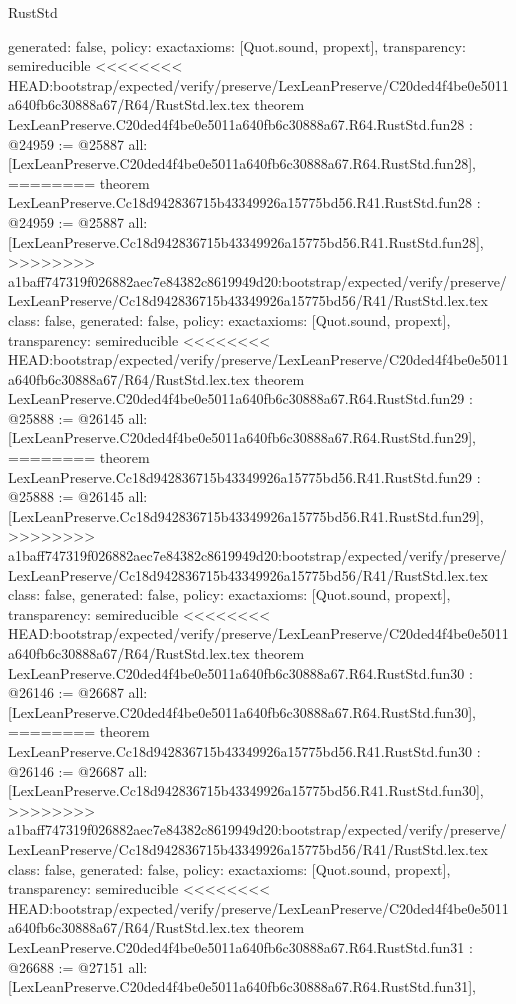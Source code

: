 \begin{lexlean}{RustStd}
\begin{coremodule}
{\begin{coremodule}
{{{{{{{{{{{{{{{{{{{{{{{{{{{{{{{  generated: false,
  policy: exact{axioms: [Quot.sound, propext]},
  transparency: semireducible
}
<<<<<<<< HEAD:bootstrap/expected/verify/preserve/LexLeanPreserve/C20ded4f4be0e5011a640fb6c30888a67/R64/RustStd.lex.tex
theorem LexLeanPreserve.C20ded4f4be0e5011a640fb6c30888a67.R64.RustStd.fun28 : @24959 := @25887 {
  all: [LexLeanPreserve.C20ded4f4be0e5011a640fb6c30888a67.R64.RustStd.fun28],
========
theorem LexLeanPreserve.Cc18d942836715b43349926a15775bd56.R41.RustStd.fun28 : @24959 := @25887 {
  all: [LexLeanPreserve.Cc18d942836715b43349926a15775bd56.R41.RustStd.fun28],
>>>>>>>> a1baff747319f026882aec7e84382c8619949d20:bootstrap/expected/verify/preserve/LexLeanPreserve/Cc18d942836715b43349926a15775bd56/R41/RustStd.lex.tex
  class: false,
  generated: false,
  policy: exact{axioms: [Quot.sound, propext]},
  transparency: semireducible
}
<<<<<<<< HEAD:bootstrap/expected/verify/preserve/LexLeanPreserve/C20ded4f4be0e5011a640fb6c30888a67/R64/RustStd.lex.tex
theorem LexLeanPreserve.C20ded4f4be0e5011a640fb6c30888a67.R64.RustStd.fun29 : @25888 := @26145 {
  all: [LexLeanPreserve.C20ded4f4be0e5011a640fb6c30888a67.R64.RustStd.fun29],
========
theorem LexLeanPreserve.Cc18d942836715b43349926a15775bd56.R41.RustStd.fun29 : @25888 := @26145 {
  all: [LexLeanPreserve.Cc18d942836715b43349926a15775bd56.R41.RustStd.fun29],
>>>>>>>> a1baff747319f026882aec7e84382c8619949d20:bootstrap/expected/verify/preserve/LexLeanPreserve/Cc18d942836715b43349926a15775bd56/R41/RustStd.lex.tex
  class: false,
  generated: false,
  policy: exact{axioms: [Quot.sound, propext]},
  transparency: semireducible
}
<<<<<<<< HEAD:bootstrap/expected/verify/preserve/LexLeanPreserve/C20ded4f4be0e5011a640fb6c30888a67/R64/RustStd.lex.tex
theorem LexLeanPreserve.C20ded4f4be0e5011a640fb6c30888a67.R64.RustStd.fun30 : @26146 := @26687 {
  all: [LexLeanPreserve.C20ded4f4be0e5011a640fb6c30888a67.R64.RustStd.fun30],
========
theorem LexLeanPreserve.Cc18d942836715b43349926a15775bd56.R41.RustStd.fun30 : @26146 := @26687 {
  all: [LexLeanPreserve.Cc18d942836715b43349926a15775bd56.R41.RustStd.fun30],
>>>>>>>> a1baff747319f026882aec7e84382c8619949d20:bootstrap/expected/verify/preserve/LexLeanPreserve/Cc18d942836715b43349926a15775bd56/R41/RustStd.lex.tex
  class: false,
  generated: false,
  policy: exact{axioms: [Quot.sound, propext]},
  transparency: semireducible
}
<<<<<<<< HEAD:bootstrap/expected/verify/preserve/LexLeanPreserve/C20ded4f4be0e5011a640fb6c30888a67/R64/RustStd.lex.tex
theorem LexLeanPreserve.C20ded4f4be0e5011a640fb6c30888a67.R64.RustStd.fun31 : @26688 := @27151 {
  all: [LexLeanPreserve.C20ded4f4be0e5011a640fb6c30888a67.R64.RustStd.fun31],
}}}}}}}}}}}}}}}}}}}}}}}}}}}}}}}}}}
\end{coremodule}}
\end{coremodule}
\end{lexlean}
